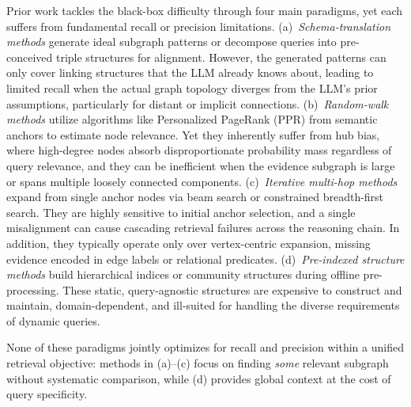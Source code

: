Prior work tackles the black-box difficulty through four main paradigms, yet each suffers from fundamental recall or precision limitations.
(a)~\textit{Schema-translation methods}\cite{2025-simgrag,2023-queryrewriting,2025-BYOKG-RAG} generate ideal subgraph patterns or decompose queries into pre-conceived triple structures for alignment. However, the generated patterns can only cover linking structures that the LLM already knows about, leading to limited recall when the actual graph topology diverges from the LLM's prior assumptions, particularly for distant or implicit connections.
(b)~\textit{Random-walk methods}\cite{2024-hipporag,2025-ragmemory,2025-linearrag,2025-agrag} utilize algorithms like Personalized PageRank (PPR)\cite{1999-pagerank} from semantic anchors to estimate node relevance. Yet they inherently suffer from hub bias, where high-degree nodes absorb disproportionate probability mass regardless of query relevance, and they can be inefficient when the evidence subgraph is large or spans multiple loosely connected components.
(c)~\textit{Iterative multi-hop methods}\cite{2025-levelrag,2025-graphsearch,2026-thinkongraph3,2024-thinkongraph,2025-thinkongraph2,2024-reasoninggraphs} expand from single anchor nodes via beam search or constrained breadth-first search. They are highly sensitive to initial anchor selection, and a single misalignment can cause cascading retrieval failures across the reasoning chain. In addition, they typically operate only over vertex-centric expansion, missing evidence encoded in edge labels or relational predicates.
(d)~\textit{Pre-indexed structure methods}\cite{2024-edge2024local,2024-kag,2025-cluerag} build hierarchical indices or community structures during offline pre-processing. These static, query-agnostic structures are expensive to construct and maintain, domain-dependent, and ill-suited for handling the diverse requirements of dynamic queries\cite{2025-indepthanalysisgraphbasedrag}.

None of these paradigms jointly optimizes for recall and precision within a unified retrieval objective: methods in (a)--(c) focus on finding \emph{some} relevant subgraph without systematic comparison, while (d) provides global context at the cost of query specificity.

